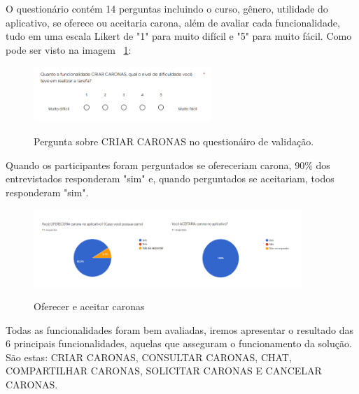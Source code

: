 O questionário contém 14 perguntas incluindo o curso, gênero, utilidade do aplicativo, se oferece ou aceitaria carona, além de avaliar cada funcionalidade, tudo em uma escala Likert de "1" para muito difícil e "5" para muito fácil. Como pode ser visto na imagem ~\ref{fig:perg_criar_caronas}:

\begin{figure}[H]
	\centering
	\caption{Pergunta sobre CRIAR CARONAS no questionáiro de validação.}
	\includegraphics[width=0.6\textwidth]{./04-figuras/validacao/perguntas.png}
	\label{fig:perg_criar_caronas}
\end{figure}

Quando os participantes foram perguntados se ofereceriam carona, 90\% dos entrevistados responderam "sim" e, quando perguntados se aceitariam, todos responderam "sim".

\begin{figure}[H]
	\centering
	\caption{Oferecer e aceitar caronas}
	\includegraphics[width=0.9\textwidth]{./04-figuras/validacao/oferecer_aceitar_carona2.png}
	\label{fig:oferecer_aceitar_carona}
\end{figure}

Todas as funcionalidades foram bem avaliadas, iremos apresentar o resultado das 6 principais funcionalidades, aquelas que asseguram o funcionamento da solução. São estas: CRIAR CARONAS, CONSULTAR CARONAS, CHAT, COMPARTILHAR CARONAS, SOLICITAR CARONAS E CANCELAR CARONAS.

